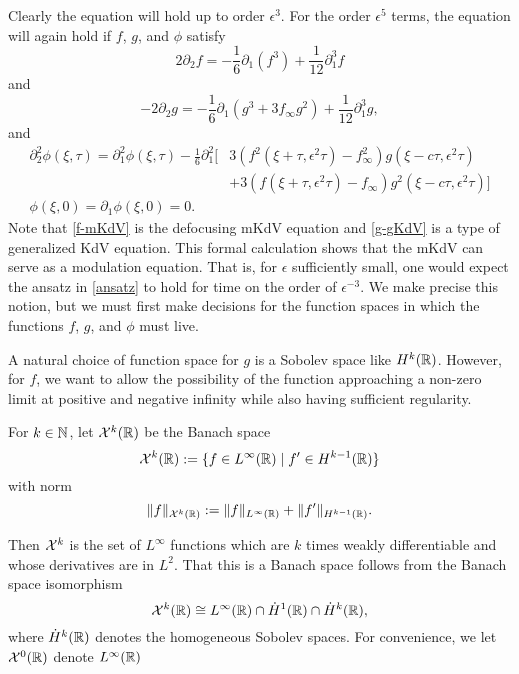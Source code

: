 Clearly the equation will hold up to order \(\epsilon^3\). For the order \(\epsilon^5\) terms, the equation will again hold if \(f\), \(g\), and \(\phi\) satisfy
\begin{equation}\label{f-mKdV}
	2 \partial_2 f = - \frac 1 6 \partial_1(f^3) + \frac 1 {12} \partial_1^3 f
\end{equation}
and 
\begin{equation}\label{g-gKdV}
	-2 \partial_2 g = - \frac 1 6 \partial_1 (g^3 + 3f_\infty g^2) + \frac 1 {12}\partial_1^3 g,
\end{equation}
and
\begin{equation}\label{phi-pde}
	\begin{aligned}
		\partial_2^2 \phi(\xi, \tau) = \partial_1^2\phi(\xi, \tau)- \frac 1 6 \partial_1^2 \big[& 3(f^2(\xi+\tau,\epsilon^2\tau)-f_\infty^2)g(\xi-c\tau,\epsilon^2\tau) \\&+ 3 (f(\xi+\tau,\epsilon^2\tau)-f_\infty)g^2(\xi-c\tau,\epsilon^2\tau) \big ] \\
		\phi(\xi,0) = \partial_1 \phi(\xi, 0) = 0.
	\end{aligned}
\end{equation}
Note that \cref{f-mKdV} is the defocusing mKdV equation and \cref{g-gKdV} is a type of generalized KdV equation. This formal calculation shows that the mKdV can serve as a modulation equation. That is, for \(\epsilon\) sufficiently small, one would expect the ansatz in \cref{ansatz} to hold for time on the order of \(\epsilon^{-3}\). We make precise this notion, but we must first make decisions for the function spaces in which the functions \(f\), \(g\), and \(\phi\) must live.

A natural choice of function space for \(g\) is a Sobolev space like \(H^k(\mathbb{R})\). However, for \(f\), we want to allow the possibility of the function approaching a non-zero limit at positive and negative infinity while also having sufficient regularity. 
\begin{defn}
	For \(k\in\mathbb{N}\), let \(\mathcal{X}^k(\mathbb{R})\) be the Banach space 
	\begin{equation}
		\mathcal{X}^k(\mathbb{R}) := \{f \in L^\infty(\mathbb{R}) \mid f'\in H^{k-1}(\mathbb{R})\}
	\end{equation}
	with norm
	\begin{equation}
		\| f \|_{\mathcal{X}^k(\mathbb{R})} := \| f \|_{L^\infty(\mathbb{R})} + \| f' \|_{H^{k-1}(\mathbb{R})}.
	\end{equation}
\end{defn}
Then \(\mathcal{X}^k\) is the set of \(L^\infty\) functions which are \(k\) times weakly differentiable and whose derivatives are in \(L^2\). That this is a Banach space follows from the Banach space isomorphism
\begin{equation}
	\mathcal{X}^k(\mathbb{R}) \cong L^\infty(\mathbb{R}) \cap \dot H^1(\mathbb{R}) \cap \dot H^k(\mathbb{R}),
\end{equation}
where \(\dot H^k(\mathbb{R})\) denotes the homogeneous Sobolev spaces. For convenience, we let \(\mathcal{X}^0(\mathbb{R})\) denote \(L^\infty(\mathbb{R})\)

